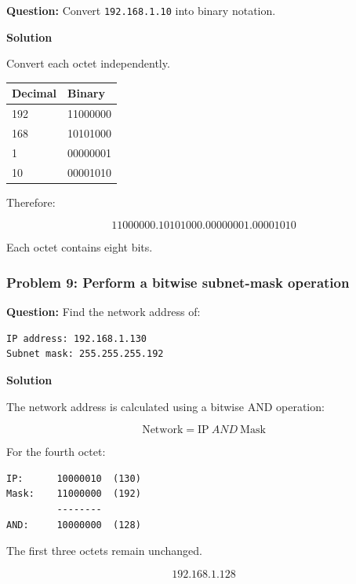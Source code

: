 \textbf{Question:} Convert \texttt{192.168.1.10} into binary notation.

\textbf{Solution}

Convert each octet independently.

\begin{center}
\begin{tabularx}{\linewidth}{p{5.5cm} X}
\toprule
\textbf{Decimal} & \textbf{Binary} \\
\midrule
192 & 11000000 \\
168 & 10101000 \\
1 & 00000001 \\
10 & 00001010 \\
\bottomrule
\end{tabularx}
\end{center}

Therefore:



\[
\boxed{11000000.10101000.00000001.00001010}
\]



Each octet contains eight bits.

\subsubsection*{Problem 9: Perform a bitwise subnet-mask operation}

\textbf{Question:} Find the network address of:

\begin{lstlisting}
IP address: 192.168.1.130
Subnet mask: 255.255.255.192
\end{lstlisting}

\textbf{Solution}

The network address is calculated using a bitwise AND operation:



\[
\text{Network}=\text{IP}\ AND\ \text{Mask}
\]



For the fourth octet:

\begin{lstlisting}
IP:      10000010  (130)
Mask:    11000000  (192)
         --------
AND:     10000000  (128)
\end{lstlisting}

The first three octets remain unchanged.



\[
\boxed{192.168.1.128}
\]



